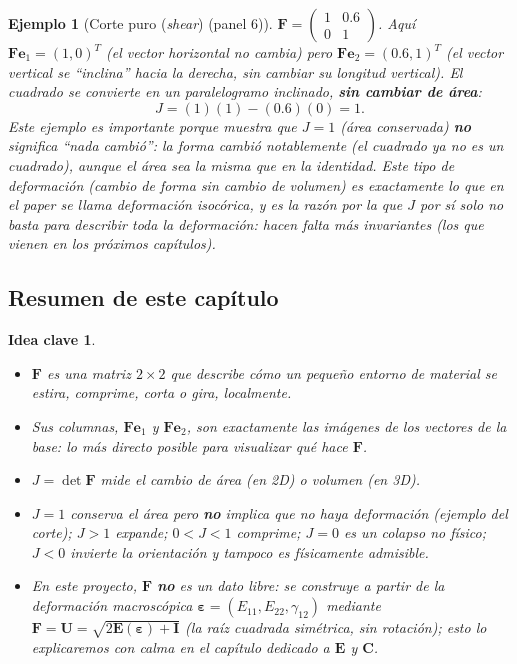\documentclass[11pt,a4paper]{article}
\newtheorem{takeaway}{Idea clave}
\newtheorem{ejemplo}{Ejemplo}
\begin{document}
\begin{ejemplo}[Corte puro (\emph{shear}) (panel 6)]
$\bm F=\begin{pmatrix}1&0.6\\0&1\end{pmatrix}$. Aqu\'i
$\bm F\bm e_1=(1,0)^T$ (el vector horizontal no cambia) pero
$\bm F\bm e_2=(0.6,1)^T$ (el vector vertical se ``inclina'' hacia la
derecha, sin cambiar su longitud vertical). El cuadrado se convierte en
un paralelogramo inclinado, \textbf{sin cambiar de \'area}:
\[
 J=(1)(1)-(0.6)(0)=1.
\]
Este ejemplo es importante porque muestra que $J=1$ (\'area conservada)
\textbf{no} significa ``nada cambi\'o'': la \emph{forma} cambi\'o
notablemente (el cuadrado ya no es un cuadrado), aunque el \'area sea
la misma que en la identidad. Este tipo de deformaci\'on (cambio de
forma sin cambio de volumen) es exactamente lo que en el paper se
llama deformaci\'on \emph{isoc\'orica}, y es la raz\'on por la que
$J$ por s\'i solo no basta para describir toda la deformaci\'on: hacen
falta m\'as invariantes (los que vienen en los pr\'oximos cap\'itulos).
\end{ejemplo}

\subsection{Resumen de este cap\'itulo}

\begin{takeaway}
\begin{itemize}
\item $\bm F$ es una matriz $2\times2$ que describe c\'omo un peque\~no
entorno de material se estira, comprime, corta o gira, localmente.
\item Sus columnas, $\bm F\bm e_1$ y $\bm F\bm e_2$, son exactamente
las im\'agenes de los vectores de la base: lo m\'as directo posible
para visualizar qu\'e hace $\bm F$.
\item $J=\det\bm F$ mide el cambio de \'area (en 2D) o volumen (en 3D).
\item $J=1$ conserva el \'area pero \textbf{no} implica que no haya
deformaci\'on (ejemplo del corte); $J>1$ expande; $0<J<1$ comprime;
$J=0$ es un colapso no f\'isico; $J<0$ invierte la orientaci\'on y
tampoco es f\'isicamente admisible.
\item En este proyecto, $\bm F$ \textbf{no} es un dato libre: se
construye a partir de la deformaci\'on macrosc\'opica
$\bm\varepsilon=(E_{11},E_{22},\gamma_{12})$ mediante
$\bm F=\bm U=\sqrt{2\bm E(\bm\varepsilon)+\bm I}$ (la ra\'iz cuadrada
sim\'etrica, sin rotaci\'on); esto lo explicaremos con calma en el
cap\'itulo dedicado a $\bm E$ y $\bm C$.
\end{itemize}
\end{takeaway}
\end{document}
